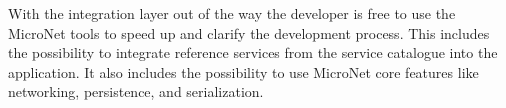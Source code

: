 With the integration layer out of the way the developer is free to use the
MicroNet tools to speed up and clarify the development process. This includes
the possibility to integrate reference services from the service catalogue into
the application. It also includes the possibility to use MicroNet core
features like networking, persistence, and serialization.

